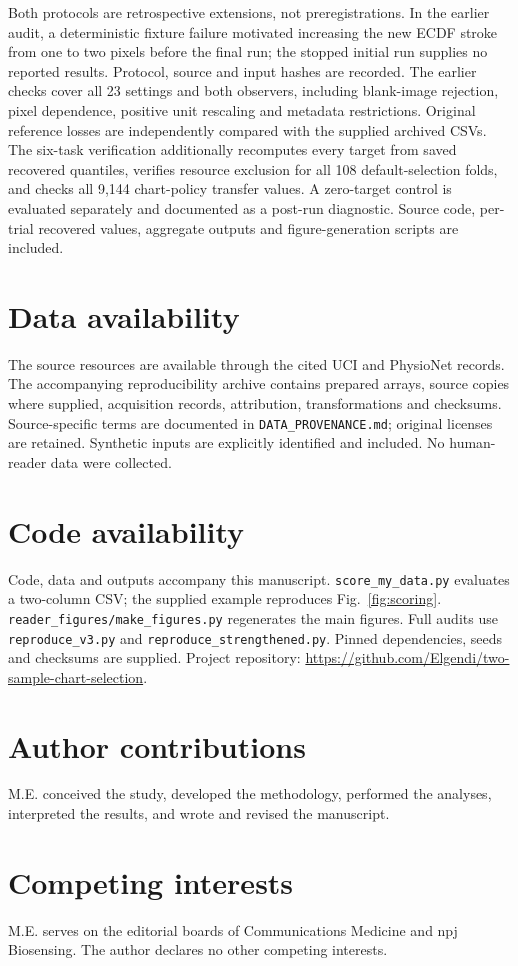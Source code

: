 \documentclass[11pt]{article}
\begin{document}
Both protocols are retrospective extensions, not preregistrations. In the earlier audit, a deterministic fixture failure motivated increasing the new ECDF stroke from one to two pixels before the final run; the stopped initial run supplies no reported results. Protocol, source and input hashes are recorded. The earlier checks cover all 23 settings and both observers, including blank-image rejection, pixel dependence, positive unit rescaling and metadata restrictions. Original reference losses are independently compared with the supplied archived CSVs. The six-task verification additionally recomputes every target from saved recovered quantiles, verifies resource exclusion for all 108 default-selection folds, and checks all 9,144 chart-policy transfer values. A zero-target control is evaluated separately and documented as a post-run diagnostic. Source code, per-trial recovered values, aggregate outputs and figure-generation scripts are included.

\section*{Data availability}
The source resources are available through the cited UCI and PhysioNet records. The accompanying reproducibility archive contains prepared arrays, source copies where supplied, acquisition records, attribution, transformations and checksums. Source-specific terms are documented in \texttt{DATA\_PROVENANCE.md}; original licenses are retained. Synthetic inputs are explicitly identified and included. No human-reader data were collected.

\section*{Code availability}
Code, data and outputs accompany this manuscript. \texttt{score\_my\_data.py} evaluates a two-column CSV; the supplied example reproduces Fig.~\ref{fig:scoring}. \texttt{reader\_figures/make\_figures.py} regenerates the main figures. Full audits use \texttt{reproduce\_v3.py} and \texttt{reproduce\_strengthened.py}. Pinned dependencies, seeds and checksums are supplied. Project repository: \url{https://github.com/Elgendi/two-sample-chart-selection}.

\section*{Author contributions}
M.E. conceived the study, developed the methodology, performed the analyses, interpreted the results, and wrote and revised the manuscript.
\section*{Competing interests}
M.E. serves on the editorial boards of Communications Medicine and npj Biosensing. The author declares no other competing interests.
\begingroup\scriptsize\setlength{\bibsep}{0pt}\endgroup
\end{document}
